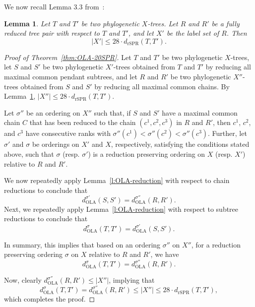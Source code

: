 \documentclass{article}
\newtheorem{lemma}{Lemma}
\newcommand{\rSPR}{\mathrm{rSPR}}
\newcommand{\OLA}{\mathrm{OLA}}
\begin{document}
We now recall Lemma 3.3 from~\cite{bordewichSemple2005}:
\begin{lemma}\label{l:reduction-size}
    Let $T$ and $T'$ be two phylogenetic $X$-trees. Let $R$ and $R'$ be a fully reduced tree pair with respect to $T$ and $T'$, and let $X'$ be the label set of $R$. Then 
    \[ \vert X' \vert \leq 28 \cdot d_\rSPR(T,T').\]
\end{lemma}

\begin{proof}[Proof of Theorem~\ref{thm:OLA-20SPR}]
Let $T$ and $T'$ be two phylogenetic $X$-trees, let $S$ and $S'$ be two phylogenetic $X'$-trees obtained from $T$ and $T'$ by reducing all maximal common pendant subtrees, and let $R$ and $R'$ be two phylogenetic $X''$-trees obtained from $S$ and $S'$ by reducing all maximal common chains. 
By Lemma~\ref{l:reduction-size}, $\vert X'' \vert \leq 28 \cdot d_\rSPR(T,T')$. 

Let $\sigma''$ be an ordering on $X''$ such that, if $S$ and $S'$ have a maximal common chain $C$ that has been reduced to the chain  $(c^1,c^2,c^3)$ in $R$ and $R'$, then $c^1$, $c^2$, and $c^3$ have consecutive ranks with $\sigma''(c^1) < \sigma''(c^2) < \sigma''(c^3)$. Further, let $\sigma'$ and $\sigma$ be orderings on $X'$ and $X$, respectively, satisfying the conditions stated above, such that $\sigma$ (resp. $\sigma'$) is a reduction preserving ordering on $X$ (resp. $X'$) relative to $R$ and $R'$.

We now repeatedly apply Lemma~\ref{l:OLA-reduction} with respect to chain reductions to conclude that 
\[ d^{\sigma'}_\OLA (S,S') = d^{\sigma''}_\OLA (R,R').\]
Next, we repeatedly apply Lemma~\ref{l:OLA-reduction} with respect to subtree reductions to conclude that 
\[ d^{\sigma}_\OLA (T,T') = d^{\sigma'}_\OLA (S,S').\]

In summary, this implies that based on an ordering $\sigma''$ on $X''$, for a reduction preserving ordering $\sigma$ on $X$ relative to $R$ and $R'$, we have
\[ d^{\sigma}_\OLA (T,T') =  d^{\sigma''}_\OLA (R,R').\]

Now, clearly $d^{\sigma''}_\OLA (R,R') \leq |X''|$, implying that
\[ d^{\sigma}_\OLA (T,T') =  d^{\sigma''}_\OLA (R,R') \leq |X''| \leq 28 \cdot d_\rSPR(T,T'),\]
which completes the proof.
\end{proof}
\end{document}
